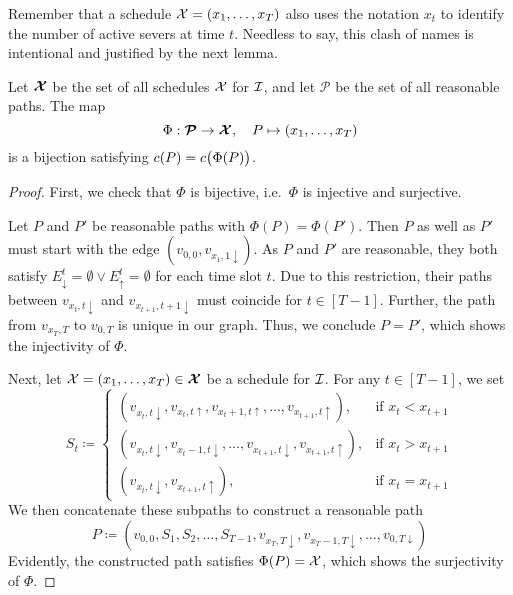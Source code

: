 Remember that a schedule $\mathcal{X}=(x_1,\dotsc,x_T)$ also uses the notation $x_t$ to identify the number of active severs at time $t$. Needless to say, this clash of names is intentional and justified by the next lemma.
\begin{lem}\label{lem:sched_reasn_path_pseudo_lin}
Let $\bm{\mathcal{X}}$ be the set of all schedules $\mathcal{X}$ for $\mathcal{I}$, and let $\bm{\mathcal{P}}$ be the set of all reasonable paths. The map
\begin{equation*}
	\Phi:\bm{\mathcal{P}}\rightarrow\bm{\mathcal{X}},\quad P\mapsto (x_1,\dotsc,x_T)
\end{equation*}
is a bijection satisfying $c(P)=c\bigl(\Phi(P)\bigr)$.
\end{lem}
\begin{proof}
First, we check that $\Phi$ is bijective, i.e.\ $\Phi$ is injective and surjective. 

Let $P$ and $P'$ be reasonable paths with $\Phi(P)=\Phi(P')$. Then $P$ as well as $P'$ must start with the edge $(v_{0,0},v_{x_1,1\downarrow})$. As $P$ and $P'$ are reasonable, they both satisfy $E_\downarrow^t=\emptyset \lor E_\uparrow^t=\emptyset$ for each time slot $t$. Due to this restriction, their paths between $v_{x_t,t\downarrow}$ and $v_{x_{t+1},t+1\downarrow}$ must coincide for $t\in[T-1]$. Further, the path from $v_{x_T,T}$ to $v_{0,T}$ is unique in our graph. Thus, we conclude $P=P'$, which shows the injectivity of $\Phi$.

Next, let $\mathcal{X}=(x_1,\dotsc,x_T)\in\bm{\mathcal{X}}$ be a schedule for $\mathcal{I}$. For any $t\in[T-1]$, we set
\begin{equation*}
	S_t\coloneqq
	\begin{cases}
		(v_{x_t,t\downarrow},v_{x_t,t\uparrow},v_{x_t+1,t\uparrow},\dotsc,v_{x_{t+1},t\uparrow}), & \text{if $x_t<x_{t+1}$}\\
		(v_{x_t,t\downarrow},v_{x_t-1,t\downarrow},\dotsc,v_{x_{t+1},t\downarrow},v_{x_{t+1},t\uparrow}), & \text{if $x_t>x_{t+1}$}\\
		(v_{x_t,t\downarrow},v_{x_{t+1},t\uparrow}), & \text{if $x_t=x_{t+1}$}
	\end{cases}
\end{equation*}
We then concatenate these subpaths to construct a reasonable path
\begin{equation*}
	P\coloneqq(v_{0,0},S_1,S_2,\dotsc,S_{T-1},v_{x_T,T\downarrow},v_{x_T-1,T\downarrow},\dotsc,v_{0,T\downarrow})
\end{equation*}
Evidently, the constructed path satisfies $\Phi(P)=\mathcal{X}$, which shows the surjectivity of $\Phi$.


\end{proof}
